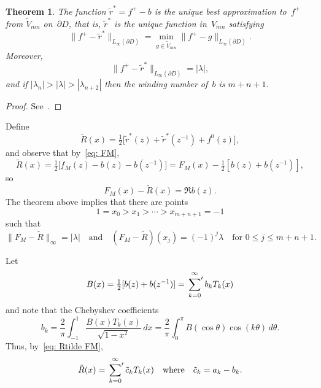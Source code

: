 \documentclass[12pt,a4paper]{article}
\newtheorem{theorem}{Theorem}
\begin{document}
\begin{theorem}
The function $\tilde r^*=f^+-b$ is the unique best approximation to~$f^+$
from $\tilde V_{mn}$ on~$\partial D$, that is, $\tilde r^*$ is the unique 
function in~$V_{mn}$ satisfying
\[
\|f^+-\tilde r^*\|_{L_\infty(\partial D)}=\min_{g\in\tilde V_{mn}}
\|f^+-g\|_{L_\infty(\partial D)}.
\]
Moreover, 
\[
\|f^+-\tilde r^*\|_{L_\infty(\partial D)}=|\lambda|,
\]
and if $|\lambda_n|>|\lambda|>|\lambda_{n+2}|$ then the winding number 
of~$b$ is $m+n+1$.  
\end{theorem}
\begin{proof}
See~\cite[Theorem~1]{TrefethenGutknecht1983}.
\end{proof}

Define
\[
\tilde R(x)=\tfrac12\bigl[\tilde r^*(z)+\tilde r^*(z^{-1})+f^0(z)\bigr],
\]
and observe that by~\eqref{eq: FM},
\begin{equation}\label{eq: Rtilde FM}
\tilde R(x)=\tfrac12\bigl[f_M(z)-b(z)-b(z^{-1})\bigr]
    =F_M(x)-\tfrac12[b(z)+b(z^{-1})],
\end{equation}
so
\[
F_M(x)-\tilde R(x)=\Re b(z).
\]
The theorem above implies that there are points
\[
1=x_0>x_1>\cdots>x_{m+n+1}=-1
\]
such that
\[
\|F_M-\tilde R\|_\infty=|\lambda|\quad\text{and}\quad
(F_M-\tilde R)(x_j)=(-1)^j\lambda\quad\text{for $0\le j\le m+n+1$.}
\]

Let
\[
B(x)=\tfrac12[b(z)+b(z^{-1})]=\sideset{}{'}\sum_{k=0}^\infty b_kT_k(x)
\]
and note that the Chebyshev coefficients
\[
b_k=\frac{2}{\pi}\int_{-1}^1\frac{B(x)T_k(x)}{\sqrt{1-x^2}}\,dx
    =\frac{2}{\pi}\int_0^\pi B(\cos\theta)\cos(k\theta)\,d\theta.
\]
Thus, by~\eqref{eq: Rtilde FM},
\[
\tilde R(x)=\sideset{}{'}\sum_{k=0}^\infty\tilde c_kT_k(x)
\quad\text{where}\quad\tilde c_k=a_k-b_k.
\]
\end{document}
